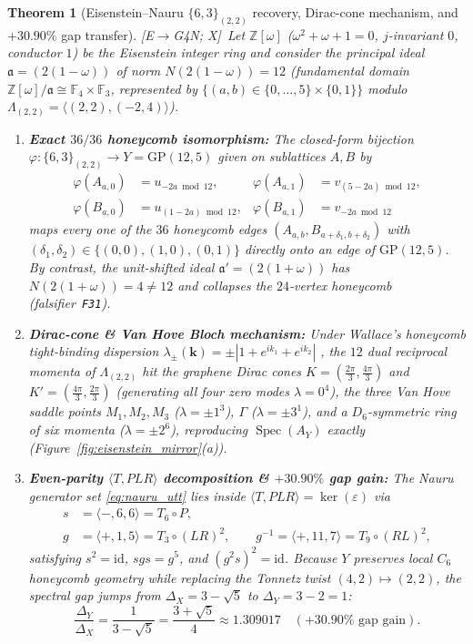 \documentclass[11pt]{amsart}
\numberwithin{equation}{section}
\theoremstyle{plain}
\newtheorem{theorem}{Theorem}[section]
\theoremstyle{definition}\newtheorem{definition}[theorem]{Definition}
\theoremstyle{remark}\newtheorem{remark}[theorem]{Remark}
\newcommand{\Z}{\mathbb{Z}}
\newcommand{\F}{\mathbb{F}}
\newcommand{\GP}{\mathrm{GP}}
\newcommand{\ctag}[1]{\textup{\textsf{\scriptsize[#1]}}}
\begin{document}
\begin{theorem}[Eisenstein--Nauru $\{6,3\}_{(2,2)}$ recovery, Dirac-cone mechanism, and $+30.90\%$ gap transfer]\label{thm:eisenstein_nauru}
\ctag{E$\to$G4N; X}\ Let $\Z[\omega]$ ($\omega^2+\omega+1=0$, $j$-invariant $0$, conductor $1$) be the Eisenstein integer ring and consider the principal ideal $\mathfrak{a}=(2(1-\omega))$ of norm $N(2(1-\omega))=12$ (fundamental domain $\Z[\omega]/\mathfrak{a}\cong\F_4\times\F_3$, represented by $\{(a,b)\in\{0,\dots,5\}\times\{0,1\}\}$ modulo $\Lambda_{(2,2)}=\langle(2,2),(-2,4)\rangle$).
\begin{enumerate}[label=(\alph*),nosep]
\item \textbf{Exact $36/36$ honeycomb isomorphism:} The closed-form bijection $\varphi:\{6,3\}_{(2,2)}\to Y=\GP(12,5)$ given on sublattices $A,B$ by
\begin{align*}
\varphi(A_{a,0}) &= u_{-2a\bmod 12}, & \varphi(A_{a,1}) &= v_{(5-2a)\bmod 12},\\
\varphi(B_{a,0}) &= u_{(1-2a)\bmod 12}, & \varphi(B_{a,1}) &= v_{-2a\bmod 12}
\end{align*}
maps every one of the $36$ honeycomb edges $(A_{a,b},B_{a+\delta_1,b+\delta_2})$ with $(\delta_1,\delta_2)\in\{(0,0),(1,0),(0,1)\}$ directly onto an edge of $\GP(12,5)$. By contrast, the unit-shifted ideal $\mathfrak{a}'=(2(1+\omega))$ has $N(2(1+\omega))=4\ne 12$ and collapses the $24$-vertex honeycomb (falsifier~\textup{\texttt{F31}}).
\item \textbf{Dirac-cone \& Van Hove Bloch mechanism:} Under Wallace's honeycomb tight-binding dispersion $\lambda_{\pm}(\mathbf{k})=\pm|1+e^{ik_1}+e^{ik_2}|$ \cite{wallace1947}, the $12$ dual reciprocal momenta of $\Lambda_{(2,2)}$ hit the graphene Dirac cones $K=(\frac{2\pi}{3},\frac{4\pi}{3})$ and $K'=(\frac{4\pi}{3},\frac{2\pi}{3})$ (generating all four zero modes $\lambda=0^4$), the three Van Hove saddle points $M_1,M_2,M_3$ ($\lambda=\pm 1^3$), $\Gamma$ ($\lambda=\pm 3^1$), and a $D_6$-symmetric ring of six momenta ($\lambda=\pm 2^6$), reproducing $\operatorname{Spec}(A_Y)$ exactly (Figure~\ref{fig:eisenstein_mirror}(a)).
\item \textbf{Even-parity $\langle T,PLR\rangle$ decomposition \& $+30.90\%$ gap gain:} The Nauru generator set \eqref{eq:nauru_utt} lies inside $\langle T,PLR\rangle=\ker(\varepsilon)$ via
\begin{equation}\label{eq:nauru_tplr}
\begin{aligned}
s &= \langle -,6,6\rangle = T_6\circ P,\\
g &= \langle +,1,5\rangle = T_3\circ(LR)^2,\qquad
g^{-1} = \langle +,11,7\rangle = T_9\circ(RL)^2,
\end{aligned}
\end{equation}
satisfying $s^2=\mathrm{id}$, $sgs=g^5$, and $(g^2s)^2=\mathrm{id}$. Because $Y$ preserves local $C_6$ honeycomb geometry while replacing the Tonnetz twist $(4,2)\mapsto(2,2)$, the spectral gap jumps from $\Delta_X=3-\sqrt{5}$ to $\Delta_Y=3-2=1$:
\[
\frac{\Delta_Y}{\Delta_X} = \frac{1}{3-\sqrt{5}} = \frac{3+\sqrt{5}}{4} \approx 1.309017 \quad (+30.90\% \text{ gap gain}).
\]
\end{enumerate}
\end{theorem}
\end{document}
